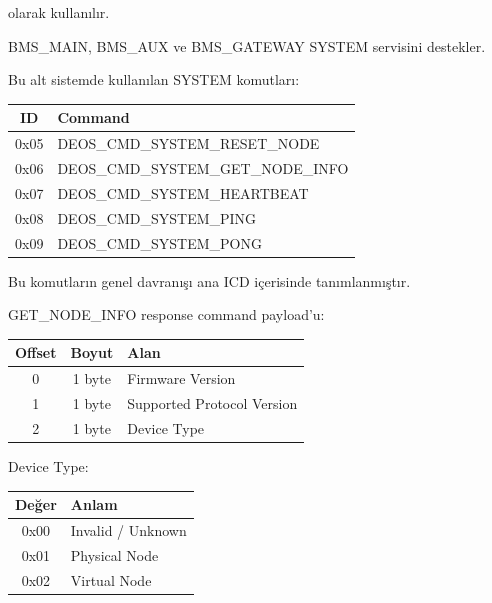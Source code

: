 \documentclass[a4paper,10pt]{article}
\begin{document}
olarak kullanılır.

BMS\_MAIN, BMS\_AUX ve BMS\_GATEWAY SYSTEM servisini destekler.

Bu alt sistemde kullanılan SYSTEM komutları:

\begin{center}
\begin{tabular}{c l}
\toprule
\textbf{ID} & \textbf{Command} \\
\midrule

0x05 & DEOS\_CMD\_SYSTEM\_RESET\_NODE \\
0x06 & DEOS\_CMD\_SYSTEM\_GET\_NODE\_INFO \\
0x07 & DEOS\_CMD\_SYSTEM\_HEARTBEAT \\
0x08 & DEOS\_CMD\_SYSTEM\_PING \\
0x09 & DEOS\_CMD\_SYSTEM\_PONG \\

\bottomrule
\end{tabular}
\end{center}

Bu komutların genel davranışı ana ICD içerisinde tanımlanmıştır.

GET\_NODE\_INFO response command payload'u:

\begin{center}
\begin{tabular}{c c l}
\toprule
\textbf{Offset} & \textbf{Boyut} & \textbf{Alan} \\
\midrule

0 & 1 byte & Firmware Version \\
1 & 1 byte & Supported Protocol Version \\
2 & 1 byte & Device Type \\

\bottomrule
\end{tabular}
\end{center}

Device Type:

\begin{center}
\begin{tabular}{c l}
\toprule
\textbf{Değer} & \textbf{Anlam} \\
\midrule
0x00 & Invalid / Unknown \\
0x01 & Physical Node \\
0x02 & Virtual Node \\
\bottomrule
\end{tabular}
\end{center}

\end{document}
